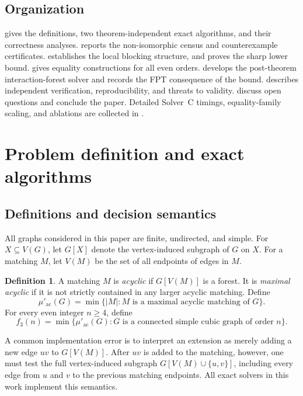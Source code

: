 \documentclass[smallextended,natbib,nospthms]{svjour3}
\theoremstyle{definition}
\newtheorem{definition}[definition]{Definition}
\theoremstyle{remark}
\newcommand{\acnum}{\mu'_{\mathrm{ac}}}
\begin{document}
\subsection{Organization}

 gives the definitions, two theorem-independent exact
algorithms, and their correctness analyses.  reports the
non-isomorphic census and counterexample certificates.
 establishes the local blocking structure, and
 proves the sharp lower bound.  gives
equality constructions for all even orders.  develops the
post-theorem interaction-forest solver and records the FPT consequence of the
bound.  describes independent verification,
reproducibility, and threats to validity.
 discuss open questions and conclude the
paper. Detailed Solver~C timings, equality-family scaling, and ablations are
collected in .

\section{Problem definition and exact algorithms}
\label{sec:definitions}

\subsection{Definitions and decision semantics}

All graphs considered in this paper are finite, undirected, and simple. For
$X\subseteq V(G)$, let $G[X]$ denote the vertex-induced subgraph of $G$ on
$X$. For a matching $M$, let $V(M)$ be the set of all endpoints of edges in
$M$.

\begin{definition}
A matching $M$ is \emph{acyclic} if $G[V(M)]$ is a forest. It is
\emph{maximal acyclic} if it is not strictly contained in any larger acyclic
matching. Define
\[
  \acnum(G)=\min\{|M|:M\text{ is a maximal acyclic matching of }G\}.
\]
For every even integer $n\geq 4$, define
\[
  f_3(n)=
  \min\{\acnum(G):G\text{ is a connected simple cubic graph of order }n\}.
\]
\end{definition}

A common implementation error is to interpret an extension as merely adding a
new edge $uv$ to $G[V(M)]$. After $uv$ is added to the matching, however, one
must test the full vertex-induced subgraph
$G[V(M)\cup\{u,v\}]$, including every edge from $u$ and $v$ to the previous
matching endpoints. All exact solvers in this work implement this semantics.
\end{document}
